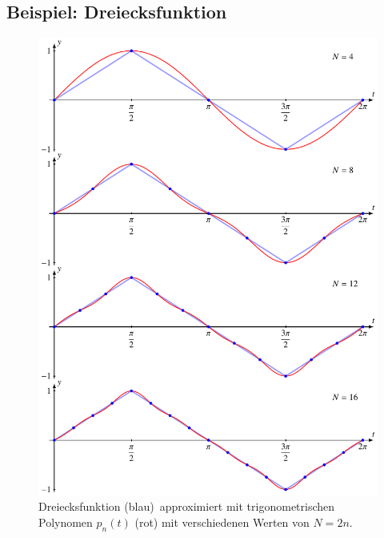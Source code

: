 \subsection{Beispiel: Dreiecksfunktion\label{subsection:fourier:dreiecksfunktion}}
\begin{figure}
\centering
\includegraphics{chapters/6/dreieck.pdf}
\caption{Dreiecksfunktion ({\color{blue}blau}) approximiert mit
trigonometrischen Polynomen  $p_n(t)$ ({\color{red}rot})
mit verschiedenen Werten von $N=2n$.
\label{skript:fourier:beispiel}}
\end{figure}
